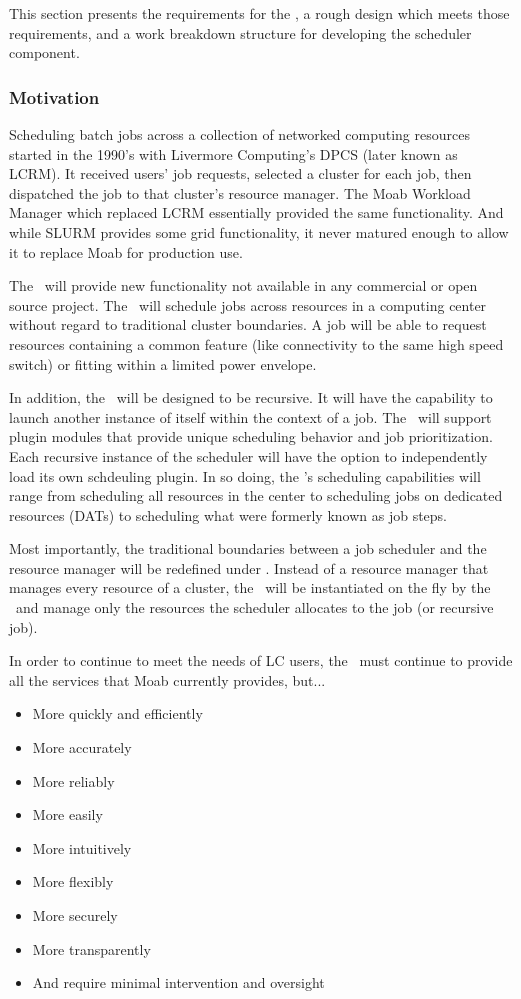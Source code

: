 This section presents the requirements for the \ngjs, a rough design
which meets those requirements, and a work breakdown structure for
developing the scheduler component.

\subsubsection{Motivation}

Scheduling batch jobs across a collection of networked computing
resources started in the 1990's with Livermore Computing's DPCS (later
known as LCRM).  It received users' job requests, selected a cluster
for each job, then dispatched the job to that cluster's resource
manager.  The Moab Workload Manager which replaced LCRM essentially
provided the same functionality.  And while SLURM provides some grid
functionality, it never matured enough to allow it to replace Moab for
production use.

The \ngjs\ will provide new functionality not available in any
commercial or open source project.  The \ngjs\ will schedule jobs
across resources in a computing center without regard to traditional
cluster boundaries.  A job will be able to request resources
containing a common feature (like connectivity to the same high speed
switch) or fitting within a limited power envelope.

In addition, the \ngjs\ will be designed to be recursive.  It will
have the capability to launch another instance of itself within the
context of a job.  The \ngjs\ will support plugin modules that provide
unique scheduling behavior and job prioritization.  Each recursive
instance of the scheduler will have the option to independently load
its own schdeuling plugin.  In so doing, the \ngjs's scheduling
capabilities will range from scheduling all resources in the center to
scheduling jobs on dedicated resources (DATs) to scheduling what were
formerly known as job steps.

Most importantly, the traditional boundaries between a job scheduler
and the resource manager will be redefined under \ngrm.  Instead of a
resource manager that manages every resource of a cluster, the
\ngrmfull\ will be instantiated on the fly by the \ngjs\ and manage
only the resources the scheduler allocates to the job (or recursive
job).

In order to continue to meet the needs of LC users, the \ngjs\ must
continue to provide all the services that Moab currently provides,
but...
\begin{itemize}
  \item More quickly and efficiently
  \item More accurately
  \item More reliably
  \item More easily
  \item More intuitively
  \item More flexibly
  \item More securely
  \item More transparently
  \item And require minimal intervention and oversight
\end{itemize}

